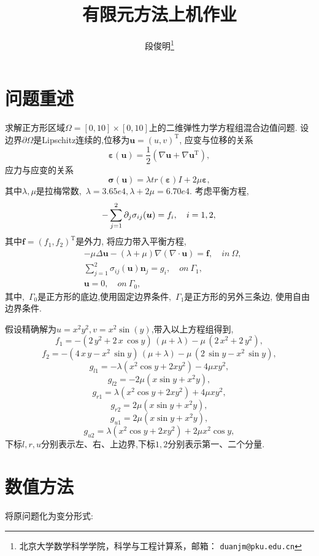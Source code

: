 \documentclass[a3paper, 11pt]{ctexart}
\title{有限元方法上机作业}
\author{段俊明\thanks{北京大学数学科学学院，科学与工程计算系，邮箱： {\tt duanjm@pku.edu.cn}}
}
\newcommand\bu{\boldsymbol{u}}
\newcommand\bn{\boldsymbol{n}}
\newcommand\dd{\mathrm{d}}
\newcommand\beps{\boldsymbol{\varepsilon}}
\newcommand\bsig{\boldsymbol{\sigma}}
\newcommand\trace[1]{tr(#1)}
\begin{document}
\maketitle

\section{问题重述}
求解正方形区域$\Omega=[0,10]\times[0,10]$上的二维弹性力学方程组混合边值问题.
设边界$\partial\Omega$是Lipschitz连续的,位移为$\bu=(u,v)^\mathrm{T}$,
应变与位移的关系
\begin{equation}
  \beps(\bu)=\frac12(\nabla\bu+\nabla\bu^{\mathrm{T}}),
\end{equation}
应力与应变的关系
\begin{equation}
  \bsig(\bu)=\lambda\trace{\beps}I+2\mu\beps,
\end{equation}
其中$\lambda,\mu$是拉梅常数,~$\lambda=3.65e4,\lambda+2\mu=6.70e4$.
考虑平衡方程,
\begin{equation}
  -\sum\limits_{j=1}^2 \partial_j\sigma_{ij}(\bu)=f_i,\quad i=1,2,\\
\end{equation}
其中$\boldsymbol{f}=(f_1,f_2)^\mathrm{T}$是外力,
将应力带入平衡方程,
\begin{align}
  &-\mu\Delta\bu-(\lambda+\mu)\nabla(\nabla\cdot\bu)=\boldsymbol{f},\quad in~\Omega,\\
  &\sum\limits_{j=1}^2 \sigma_{ij}(\bu)\bn_j=g_i,\quad on~\Gamma_1,\\
  &\bu=0,\quad on~\Gamma_0,
\end{align}
其中,~$\Gamma_0$是正方形的底边,使用固定边界条件,~$\Gamma_1$是正方形的另外三条边,
使用自由边界条件.

假设精确解为$u=x^2y^2,v=x^2\sin(y)$,带入以上方程组得到,
$$f_1=-\left(2\,y^2+2\,x\,\cos y\right)\,\left(\mu+\lambda\right)-\mu\,
\left(2\,x^2+2\,y^2\right),$$
$$f_2=-\left(4\,x\,y-x^2\,\sin y\right)\,\left(\mu+\lambda\right)-\mu\,
\left(2\,\sin y-x^2\,\sin y\right),$$
$$g_{l1}=-\lambda(x^2\cos y+2xy^2)-4\mu xy^2, $$
$$g_{l2}=-2\mu(x\sin y+x^2y), $$
$$g_{r1}=\lambda(x^2\cos y+2xy^2)+4\mu xy^2, $$
$$g_{r2}=2\mu(x\sin y+x^2y), $$
$$g_{u1}=2\mu(x\sin y+x^2y), $$
$$g_{u2}=\lambda(x^2\cos y+2xy^2)+2\mu x^2\cos y, $$
下标$l,r,u$分别表示左、右、上边界,下标$1,2$分别表示第一、二个分量.

\section{数值方法}
将原问题化为变分形式:
\end{document}
